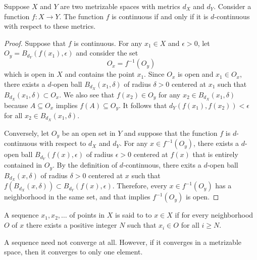 \begin{theorem}
Suppose $X$ and $Y$ are two metrizable spaces with metrics $d_X$ and $d_Y$.
Consider a function $f : X \rightarrow Y$.
The function $f$ is continuous if and only if it is $d$-continuous with respect to these metrics.
\end{theorem}
\begin{proof}
Suppose that $f$ is continuous.
For any $x_1 \in X$ and $\epsilon > 0$, let $O_y =  B_{d_Y} (f(x_1), \epsilon)$ and consider the set
\begin{equation*}
O_x = f^{-1} \left( O_y \right)
\end{equation*}
which is open in $X$ and contains the point $x_1$.
Since $O_x$ is open and $x_1 \in O_x$, there exists a $d$-open ball $B_{d_X} (x_1, \delta)$ of radius $\delta>0$ centered at $x_1$ such that $B_{d_X} (x_1, \delta) \subset O_x$.
We also see that $f(x_2) \in O_y$ for any $x_2 \in B_{d_X} (x_1, \delta)$ because $A \subseteq O_x$ implies $f(A) \subseteq O_y$.
It follows that $d_Y \left( f(x_1), f(x_2) \right) < \epsilon$ for all $x_2 \in B_{d_X} (x_1, \delta)$.

Conversely, let $O_y$ be an open set in $Y$ and suppose that the function $f$ is $d$-continuous with respect to $d_X$ and $d_Y$.
For any $x \in f^{-1} (O_y)$, there exists a $d$-open ball $B_{d_Y} (f(x), \epsilon)$ of radius $\epsilon>0$ centered at $f(x)$ that is entirely contained in $O_y$.
By the definition of $d$-continuous, there exits a $d$-open ball $B_{d_X} (x, \delta)$ of radius $\delta>0$ centered at $x$ such that $f \left( B_{d_X} (x,\delta) \right) \subset B_{d_Y} \left( f(x), \epsilon \right)$.
Therefore, every $x \in f^{-1}(O_y)$ has a neighborhood in the same set, and that implies $f^{-1} (O_y)$ is open.
\end{proof}

\begin{definition} \label{definition:SequenceConvergence}
A sequence $x_1, x_2, \ldots$ of points in $X$ is said to  to $x \in X$ if for every neighborhood $O$ of $x$ there exists a positive integer $N$ such that $x_i \in O$ for all $i \geq N$.
\end{definition}

A sequence need not converge at all.
However, if it converges in a metrizable space, then it converges to only one element.

